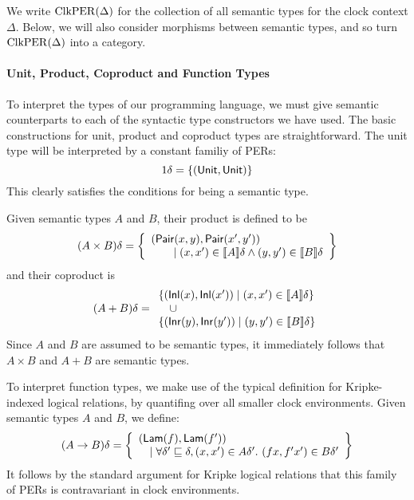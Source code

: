 We write $\mathrm{ClkPER}(\Delta)$ for the collection of all semantic types
for the clock context $\Delta$. Below, we will also consider morphisms
between semantic types, and so turn $\mathrm{ClkPER}(\Delta)$ into a
category. %


\paragraph{Unit, Product, Coproduct and Function Types}

To interpret the types of our programming language, we must give
semantic counterparts to each of the syntactic type constructors we
have used. The basic constructions for unit, product and coproduct
types are straightforward. The unit type will be interpreted by a
constant familiy of PERs:
\begin{displaymath}
  1\delta = \{(\mathsf{Unit}, \mathsf{Unit})\}
\end{displaymath}
This clearly satisfies the conditions for being a semantic type.

Given semantic types $A$ and $B$, their product is defined to be
\begin{displaymath}
  (A \times B)\delta =
  \left\{
    \begin{array}{l}
      (\mathsf{Pair}(x,y),\mathsf{Pair}(x',y')) \\
      \quad\quad\mathrel| (x,x') \in \llbracket A \rrbracket\delta \land (y,y') \in \llbracket B \rrbracket\delta 
    \end{array}
  \right\}
\end{displaymath}
and their coproduct is
\begin{displaymath}
  (A + B)\delta =
  \begin{array}{l}
    \{ (\mathsf{Inl}(x), \mathsf{Inl}(x')) \mathrel| (x,x') \in \llbracket A \rrbracket\delta \} \\
    \quad \cup \\
    \{ (\mathsf{Inr}(y),\mathsf{Inr}(y')) \mathrel| (y,y') \in \llbracket B \rrbracket\delta \}
  \end{array}
\end{displaymath}
Since $A$ and $B$ are assumed to be semantic types, it immediately
follows that $A \times B$ and $A + B$ are semantic types.

To interpret function types, we make use of the typical definition for
Kripke-indexed logical relations, by quantifing over all smaller clock
environments. Given semantic types $A$ and $B$, we define:
\begin{displaymath}
  (A \to B)\delta = \left\{
    \begin{array}{l}
      (\mathsf{Lam}(f),\mathsf{Lam}(f')) \\
      \quad \mathrel| \forall \delta' \sqsubseteq \delta, (x,x') \in A\delta'.\ (fx,f'x') \in B\delta'
    \end{array}
  \right\}
\end{displaymath}
It follows by the standard argument for Kripke logical relations that
this family of PERs is contravariant in clock environments.

